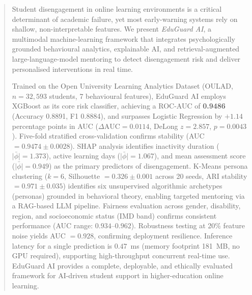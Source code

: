 \begin{abstract}
Student disengagement in online learning environments is a critical
determinant of academic failure, yet most early-warning systems rely on
shallow, non-interpretable features. We present \textit{EduGuard AI}, a
multimodal machine-learning framework that integrates psychologically
grounded behavioural analytics, explainable AI, and retrieval-augmented
large-language-model mentoring to detect disengagement risk and deliver
personalised interventions in real time.

Trained on the Open University Learning Analytics Dataset (OULAD,
\(n = 32{,}593\) students, 7 behavioural features), EduGuard AI employs
XGBoost as its core risk classifier, achieving a ROC-AUC of
\textbf{0.9486} (Accuracy 0.8891, F1 0.8884), and surpasses
Logistic Regression by \(+1.14\) percentage points in AUC
(\(\Delta\text{AUC} = 0.0114\), DeLong \(z = 2.857\),
\(p = 0.0043\)).
Five-fold stratified cross-validation confirms stability
(AUC \(= 0.9474 \pm 0.0028\)).
SHAP analysis identifies inactivity duration (\(\bar{|\phi|}=1.373\)),
active learning days (\(\bar{|\phi|}=1.067\)), and mean assessment
score (\(\bar{|\phi|}=0.949\)) as the primary predictors of
disengagement.
K-Means persona clustering (\(k=6\), Silhouette
\(= 0.326 \pm 0.001\) across 20 seeds, ARI stability
\(= 0.971 \pm 0.035\)) identifies six unsupervised algorithmic archetypes
(personas) grounded in behavioral theory, enabling targeted mentoring via a RAG-based LLM pipeline.
Fairness evaluation across gender, disability, region, and
socioeconomic status (IMD band) confirms consistent performance
(AUC range: \(0.934\)–\(0.962\)).
Robustness testing at 20\% feature noise yields AUC \(= 0.928\),
confirming deployment resilience.
Inference latency for a single prediction is \(0.47\)~ms (memory footprint
181~MB, no GPU required), supporting high-throughput concurrent real-time use.
EduGuard AI provides a complete, deployable, and ethically evaluated
framework for AI-driven student support in higher-education online
learning.
\end{abstract}



